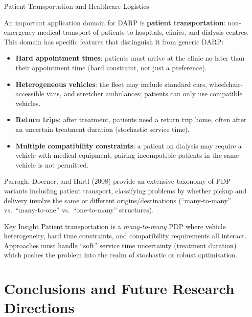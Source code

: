 \documentclass[aspectratio=169,10pt]{beamer}
\begin{document}
\begin{frame}[allowframebreaks]{Patient Transportation and Healthcare Logistics}

  An important application domain for DARP is \textbf{patient transportation}:
  non-emergency medical transport of patients to hospitals, clinics, and
  dialysis centres.  This domain has specific features that distinguish it
  from generic DARP:

  \begin{itemize}
    \item \textbf{Hard appointment times}: patients must arrive at the clinic
          no later than their appointment time (hard constraint, not just
          a preference).
    \item \textbf{Heterogeneous vehicles}: the fleet may include standard
          cars, wheelchair-accessible vans, and stretcher ambulances; patients
          can only use compatible vehicles.
    \item \textbf{Return trips}: after treatment, patients need a return trip
          home, often after an uncertain treatment duration (stochastic
          service time).
    \item \textbf{Multiple compatibility constraints}: a patient on dialysis
          may require a vehicle with medical equipment; pairing
          incompatible patients in the same vehicle is not permitted.
  \end{itemize}

  Parragh, Doerner, and Hartl (2008) provide an extensive taxonomy of PDP
  variants including patient transport, classifying problems by whether
  pickup and delivery involve the same or different origins/destinations
  (``many-to-many'' vs.\ ``many-to-one'' vs.\ ``one-to-many'' structures).

  \begin{alertblock}{Key Insight}
    Patient transportation is a \emph{many-to-many} PDP where vehicle
    heterogeneity, hard time constraints, and compatibility requirements
    all interact.  Approaches must handle ``soft'' service time uncertainty
    (treatment duration) which pushes the problem into the realm of
    stochastic or robust optimisation.
  \end{alertblock}

\end{frame}

\section{Conclusions and Future Research Directions}
\end{document}

